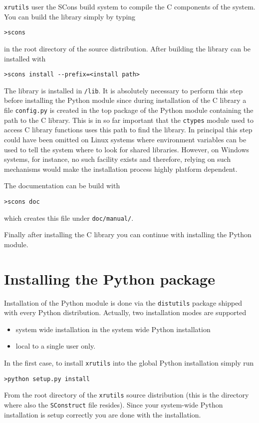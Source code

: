 {\tt xrutils} user the SCons build system to compile the C components of the
system. You can build the library simply by typing 
\begin{verbatim}
>scons
\end{verbatim}
in the root directory of the source distribution. After building the library can
be installed with
\begin{verbatim}
>scons install --prefix=<install path>
\end{verbatim}
The library is installed in {\tt<install path>/lib}. It is absolutely necessary
to perform this step before installing the Python module since during
installation of the C library a file {\tt config.py} is created in the top
package of the Python module containing the path to the C library. This is in so
far important that the {\tt ctypes} module used to access C library functions
uses this path to find the library. In principal this step could have been
omitted on Linux systems where environment variables can be used to tell the
system where to look for shared libraries. However, on Windows systems, for
instance, no such facility exists and therefore, relying on such mechanisms
would make the installation process highly platform dependent. 

The documentation can be build with 
\begin{verbatim}
>scons doc
\end{verbatim}
which creates this file under {\tt doc/manual/}.

Finally after installing the C library you can continue with installing the
Python module.

\section{Installing the Python package}

Installation of the Python module is done via the {\tt distutils} package
shipped with every Python distribution. Actually, two installation modes are 
supported
\begin{itemize}
 \item system wide installation in the system wide Python installation
 \item local to a single user only.
\end{itemize}

In the first case, to install {\tt xrutils} into the global Python installation
simply run
\begin{verbatim}
>python setup.py install
\end{verbatim}
From the root directory of the {\tt xrutils} source distribution (this is the
directory where also the {\tt SConstruct} file resides). Since your system-wide
Python installation is setup correctly you are done with the installation.

